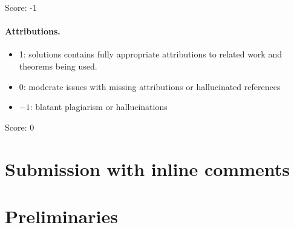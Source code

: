\documentclass[11pt]{article}
\theoremstyle{definition}
\theoremstyle{remark}
\newcommand{\Hb}{\mathbb{H}}
\newcommand{\bp}{\boxplus}
\begin{document}
\noindent Score: -1

\paragraph{Attributions.}
\begin{itemize}
	\item  1: solutions contains fully appropriate attributions
		to related work and theorems being used.
	\item  0: moderate issues with missing attributions or hallucinated references
	\item  $-1$: blatant plagiarism or hallucinations
\end{itemize}

\noindent Score: 0 

\newpage
\section{Submission with inline comments}


\begin{abstract}
\noindent\textbf{Problem.} Let $\Hb$ be a hyperfield with hyperaddition
$\boxplus$. For $x,y,z\in\Hb$ with $0\in x\bp y\bp z$, does it follow that
$0\in x^{3}\bp y^{3}\bp z^{3}\bp(-xyz)\bp(-xyz)\bp(-xyz)$?

\smallskip\noindent\textbf{Content of this document.} We give complete
proofs, from the hyperfield axioms alone, of the degenerate case $xyz=0$
(Proposition~\ref{prop:degen}) and of the case in which one of the three
pair sums $x\bp y$, $x\bp z$, $y\bp z$ is a singleton
(Corollary~\ref{cor:collapse}). The remaining case is isolated in the
precisely stated Elevation Problem~\ref{prob:elevation}, which is
equivalent to the unrestricted statement; the document proves the
conditional implication (Elevation Problem $\Rightarrow$ full theorem) in
Theorem~\ref{thm:main}. We do not assert the unrestricted answer ``yes''
as proved in this round; no computation, and no external theorem
or unproved lemma is used as a proof step anywhere below.
\end{abstract}

\section{Preliminaries}\label{sec:prelim}
\end{document}
